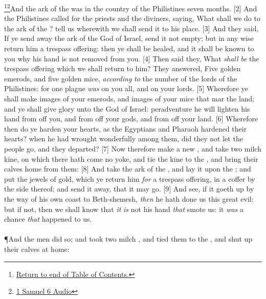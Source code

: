 \footnote{\textcolor[cmyk]{0.99998,1,0,0}{\hyperlink{TOC}{Return to end of Table of Contents.}}}\footnote{\href{https://audiobible.com/bible/1_samuel_6.html}{\textcolor[cmyk]{0.99998,1,0,0}{1 Samuel 6 Audio}}}\textcolor[cmyk]{0.99998,1,0,0}{And the ark of the  was in the country of the Philistines seven months.}
[2] \textcolor[cmyk]{0.99998,1,0,0}{And the Philistines called for the priests and the diviners, saying, What shall we do to the ark of the ? tell us wherewith we shall send it to his place.}
[3] \textcolor[cmyk]{0.99998,1,0,0}{And they said, If ye send away the ark of the God of Israel, send it not empty; but in any wise return him a trespass offering: then ye shall be healed, and it shall be known to you why his hand is not removed from you.}
[4] \textcolor[cmyk]{0.99998,1,0,0}{Then said they, What \emph{shall} \emph{be} the trespass offering which we shall return to him? They answered, Five golden emerods, and five golden mice, \emph{according} \emph{to} the number of the lords of the Philistines: for one plague \emph{was} on you all, and on your lords.}
[5] \textcolor[cmyk]{0.99998,1,0,0}{Wherefore ye shall make images of your emerods, and images of your mice that mar the land; and ye shall give glory unto the God of Israel: peradventure he will lighten his hand from off you, and from off your gods, and from off your land.}
[6] \textcolor[cmyk]{0.99998,1,0,0}{Wherefore then do ye harden your hearts, as the Egyptians and Pharaoh hardened their hearts? when he had wrought wonderfully among them, did they not let the people go, and they departed?}
[7] \textcolor[cmyk]{0.99998,1,0,0}{Now therefore make a new , and take two milch kine, on which there hath come no yoke, and tie the kine to the , and bring their calves home from them:}
[8] \textcolor[cmyk]{0.99998,1,0,0}{And take the ark of the , and lay it upon the ; and put the jewels of gold, which ye return him \emph{for} a trespass offering, in a coffer by the side thereof; and send it away, that it may go.}
[9] \textcolor[cmyk]{0.99998,1,0,0}{And see, if it goeth up by the way of his own coast to Beth-shemesh, \emph{then} he hath done us this great evil: but if not, then we shall know that \emph{it} \emph{is} not his hand \emph{that} smote us: it \emph{was} a chance \emph{that} happened to us.}\\
\\
\P \textcolor[cmyk]{0.99998,1,0,0}{And the men did so; and took two milch , and tied them to the , and shut up their calves at home:}
